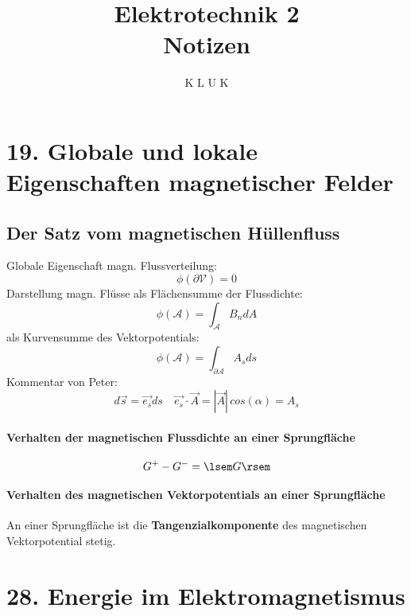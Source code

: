 \documentclass[12pt]{article}
\title{Elektrotechnik 2 \\ Notizen }
\author{K L U K}
\begin{document}
\maketitle 
\newpage
\section{19. Globale und lokale Eigenschaften magnetischer Felder}
\subsection{Der Satz vom magnetischen Hüllenfluss}
Globale Eigenschaft magn. Flussverteilung:
\begin{equation}\label{key}
\phi(\partial \mathcal{V}) = 0
\end{equation}
Darstellung magn. Flüsse als Flächensumme der Flussdichte: 
\begin{equation}\label{key}
\phi(\mathcal{A}) = \int_{\mathcal{A}} B_n dA
\end{equation}
als Kurvensumme des Vektorpotentials: 
\begin{equation}\label{key}
\phi(\mathcal{A})=\int_{\partial \mathcal{A}} A_s ds
\end{equation}
Kommentar von Peter: 
\begin{equation}\label{key}
d\vec{s} = \vec{e_s} ds  \quad \vec{e_s}\cdot \vec{A} = |\vec{A}|\, cos(\alpha) = A_s 
\end{equation}
\paragraph{Verhalten der magnetischen Flussdichte an einer Sprungfläche}

\begin{equation}\label{key}
G^+-G^-=\lsem G \rsem
\end{equation}
\paragraph{Verhalten des magnetischen Vektorpotentials an einer Sprungfläche} %
An einer Sprungfläche ist die \textbf{Tangenzialkomponente } des magnetischen Vektorpotential stetig. 
\newpage






\section*{28. Energie im Elektromagnetismus}
\end{document}

